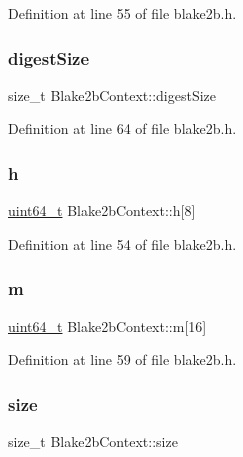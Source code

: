 Definition at line 55 of file blake2b.\+h.

\mbox{\label{structBlake2bContext_a90c528ad18d05f458cf5f57f029973fa}} 
\subsubsection{\texorpdfstring{digest\+Size}{digestSize}}
{\footnotesize\ttfamily size\+\_\+t Blake2b\+Context\+::digest\+Size}



Definition at line 64 of file blake2b.\+h.

\mbox{\label{structBlake2bContext_af58742ce97114c25ec5062b180c1d344}} 
\subsubsection{\texorpdfstring{h}{h}}
{\footnotesize\ttfamily \hyperlink{stdint_8h_aec6fcb673ff035718c238c8c9d544c47}{uint64\+\_\+t} Blake2b\+Context\+::h\mbox{[}8\mbox{]}}



Definition at line 54 of file blake2b.\+h.

\mbox{\label{structBlake2bContext_a1c5c35e976cc71762722092c34cdf09f}} 
\subsubsection{\texorpdfstring{m}{m}}
{\footnotesize\ttfamily \hyperlink{stdint_8h_aec6fcb673ff035718c238c8c9d544c47}{uint64\+\_\+t} Blake2b\+Context\+::m\mbox{[}16\mbox{]}}



Definition at line 59 of file blake2b.\+h.

\mbox{\label{structBlake2bContext_a67cdba5ee54f03a5c0a779a2547781e4}} 
\subsubsection{\texorpdfstring{size}{size}}
{\footnotesize\ttfamily size\+\_\+t Blake2b\+Context\+::size}



